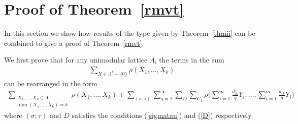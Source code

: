 \documentclass[11pt]{article}
\theoremstyle{definition}
\theoremstyle{proof}
\begin{document}
\section{Proof of Theorem~\ref{rmvt}}\label{proofrmvt}
In this section we show how results of the type given by Theorem~\ref{thmii} can be combined to give a proof of Theorem~\ref{rmvt}.

We first prove that for any unimodular lattice $\Lambda$, the terms in the sum
\begin{align}\label{awfulsumlhsi}
    \sum_{X \in \Lambda ^k - \{0\}} \rho(X_1, \ldots, X_k)
\end{align}
can be rearranged in the form
\begin{align}\label{awfulsumrhsi}
    \sum_{\substack{X_1, \ldots, X_k \in \Lambda \\ \dim (X_1, \ldots, X_k) = k}} \rho(X_1, \ldots, X_k) + \sum_{(\sigma ; \tau )}\sum_{q = 1}^{\infty} \sum_{D} \sum_{C_1} \rho\bigg(\sum_{i=1}^{m}\frac{d_{i1}}{q}Y_i, \ldots, \sum_{i=1}^{m}\frac{d_{ik}}{q}Y_i \bigg)
\end{align}
where $(\sigma; \tau )$ and $D$ satisfies the conditions (\ref{sigmatau}) and (\ref{D}) respectively.
\end{document}
